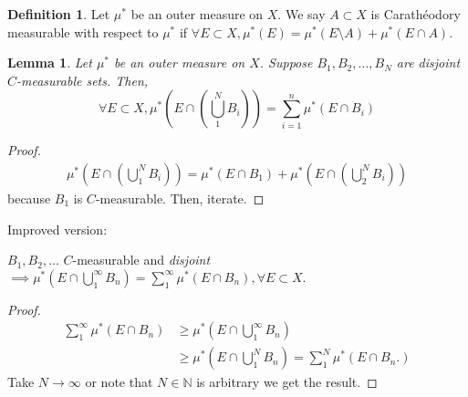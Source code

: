 \documentclass{report}
\newcommand{\N}{\mathbb{N}}
\newtheorem{lemma}[theorem]{Lemma}
\theoremstyle{definition}
\newtheorem{definition}[theorem]{Definition}
\theoremstyle{remark}
\begin{document}
\begin{definition}
Let $\mu^*$ be an outer measure on $X$. We say $A \subset X$ is Carathéodory measurable with respect to $\mu^*$ if $\forall E \subset X, \mu^*(E) = \mu^*(E \setminus A) + \mu^*(E \cap A).$ 
\end{definition}
\begin{lemma}
Let $\mu^*$ be an outer measure on $X$. Suppose $B_1, B_2, \ldots, B_N$ are disjoint $C$-measurable sets. Then,
\[
\forall E \subset X, \mu^*\left(E \cap \left(\bigcup_{1}^N B_i\right)\right) = \sum_{i=1}^n \mu^*(E \cap B_i)
\]
\end{lemma}
\begin{proof}
\begin{align*}
\mu^*\left(E \cap \left(\bigcup_1^N B_i\right)\right) = \mu^*(E \cap B_1) +  \mu^*\left(E \cap \left(\bigcup_2^N B_i\right)\right)
\end{align*}
because $B_1$ is $C$-measurable.
Then, iterate.
\end{proof}

Improved version: 

$B_1, B_2, \ldots$ $C$-measurable and \emph{disjoint} $\implies \mu^*\left(E \cap \bigcup_1^\infty B_n\right) = \sum_1^\infty \mu^*\left(E \cap B_n\right), \forall E \subset X.$
\begin{proof}
\begin{align*}
\sum_1^\infty \mu^*(E \cap B_n) & \geq \mu^*\left(E \cap \bigcup_1^\infty B_n\right) \\
& \geq \mu^*\left(E \cap \bigcup_1^N B_n \right) = \sum_1^N \mu^*(E \cap B_n.)
\end{align*}
Take $N \to \infty$ or note that $N \in \N$ is arbitrary we get the result.
\end{proof}
\end{document}

